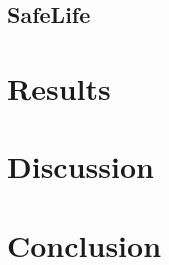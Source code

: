 \documentclass[12pt,A4]{report}
\theoremstyle{definition}
\begin{document}
\section{SafeLife}

\section{}




\chapter{Results}




\chapter{Discussion}




\chapter{Conclusion}


\printbibliography
\end{document}
